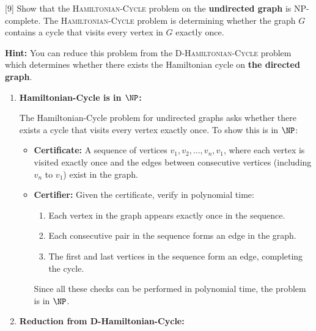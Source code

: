 [9]
Show that the \textsc{Hamiltonian-Cycle} problem on the \textbf{undirected graph} is NP-complete. The \textsc{Hamiltonian-Cycle} problem is determining whether the graph $G$ contains a cycle that visits every vertex in $G$ exactly once. 

\textbf{Hint: } You can reduce this problem from the \textsc{D-Hamiltonian-Cycle} problem which determines whether there exists the Hamiltonian cycle on \textbf{the directed graph}.


\begin{solution}

\begin{enumerate}

  \item \textbf{Hamiltonian-Cycle is in \( \NP \):}
  
  The Hamiltonian-Cycle problem for undirected graphs asks whether there exists a cycle that visits every vertex exactly once. To show this is in \( \NP \):

  \begin{itemize}
    \item \textbf{Certificate:} A sequence of vertices \( v_1, v_2, \ldots, v_n, v_1 \), where each vertex is visited exactly once and the edges between consecutive vertices (including \( v_n \) to \( v_1 \)) exist in the graph.

    \item \textbf{Certifier:} Given the certificate, verify in polynomial time:
    \begin{enumerate}
      \item Each vertex in the graph appears exactly once in the sequence.
      \item Each consecutive pair in the sequence forms an edge in the graph.
      \item The first and last vertices in the sequence form an edge, completing the cycle.
    \end{enumerate}
  
    Since all these checks can be performed in polynomial time, the problem is in \( \NP \).
  \end{itemize}

  \item \textbf{Reduction from D-Hamiltonian-Cycle:}
  

\end{enumerate}
\end{solution}
